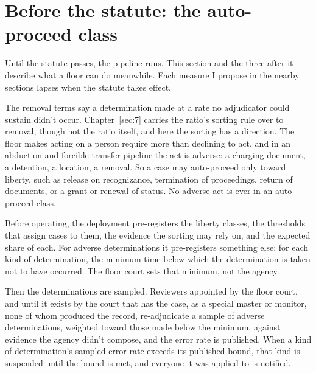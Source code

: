 \section{Before the statute: the auto-proceed class}
\label{sec:11.5}
Until the statute passes, the pipeline runs. This section and the three after it describe what a floor can do meanwhile. Each measure I propose in the nearby sections lapses when the statute takes effect.

The removal terms say a determination made at a rate no adjudicator could sustain didn't occur. Chapter~\ref{sec:7} carries the ratio's sorting rule over to removal, though not the ratio itself, and here the sorting has a direction. The floor makes acting on a person require more than declining to act, and in an abduction and forcible transfer pipeline the act is adverse: a charging document, a detention, a location, a removal. So a case may auto-proceed only toward liberty, such as release on recognizance, termination of proceedings, return of documents, or a grant or renewal of status. No adverse act is ever in an auto-proceed class.

Before operating, the deployment pre-registers the liberty classes, the thresholds that assign cases to them, the evidence the sorting may rely on, and the expected share of each. For adverse determinations it pre-registers something else: for each kind of determination, the minimum time below which the determination is taken not to have occurred. The floor court sets that minimum, not the agency.

Then the determinations are sampled. Reviewers appointed by the floor court, and until it exists by the court that has the case, as a special master or monitor, none of whom produced the record, re-adjudicate a sample of adverse determinations, weighted toward those made below the minimum, against evidence the agency didn't compose, and the error rate is published. When a kind of determination's sampled error rate exceeds its published bound, that kind is suspended until the bound is met, and everyone it was applied to is notified.
